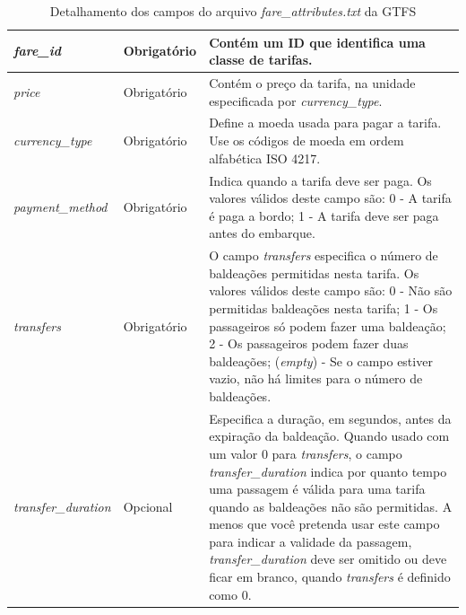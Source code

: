 \documentclass[
	12pt,				%
	oneside,			%
	a4paper,			%
	english,			%
	brazil				%
	]{abntex2ppgsi}
\begin{document}
{{\begin{apendicesenv}
\begin{table}
\caption{Detalhamento dos campos do arquivo \textit{fare\_attributes.txt} da GTFS}
      \label{tab:gtfsFareAttributes}
\begin{tabular}[!htb]{>{\centering\arraybackslash}m{3.8cm} | >{\centering}m{2.5cm} | >{\centering\arraybackslash}m{8.5cm}}
\hline 
\textit{fare\_id} & Obrigatório & Contém um ID que identifica uma classe de tarifas. \\
\hline 
\textit{price} & Obrigatório & Contém o preço da tarifa, na unidade especificada por \textit{currency\_type}. \\
\hline 
\textit{currency\_type} & Obrigatório & Define a moeda usada para pagar a tarifa. Use os códigos de moeda em ordem alfabética ISO 4217. \\
\hline 
\textit{payment\_method} & Obrigatório & Indica quando a tarifa deve ser paga. Os valores válidos deste campo são: 0 - A tarifa é paga a bordo; 1 - A tarifa deve ser paga antes do embarque. \\
\hline 
\textit{transfers} & Obrigatório & O campo \textit{transfers} especifica o número de baldeações permitidas nesta tarifa. Os valores válidos deste campo são: 0 - Não são permitidas baldeações nesta tarifa; 1 - Os passageiros só podem fazer uma baldeação; 2 - Os passageiros podem fazer duas baldeações; (\textit{empty}) - Se o campo estiver vazio, não há limites para o número de baldeações. \\
\hline 
\textit{transfer\_duration} & Opcional & Especifica a duração, em segundos, antes da expiração da baldeação. Quando usado com um valor 0 para \textit{transfers}, o campo \textit{transfer\_duration} indica por quanto tempo uma passagem é válida para uma tarifa quando as baldeações não são permitidas. A menos que você pretenda usar este campo para indicar a validade da passagem, \textit{transfer\_duration} deve ser omitido ou deve ficar em branco, quando \textit{transfers} é definido como 0. \\
\hline 
\end{tabular}
\end{table}
\vspace{-\baselineskip}

\clearpage


\end{apendicesenv}}}
\end{document}
